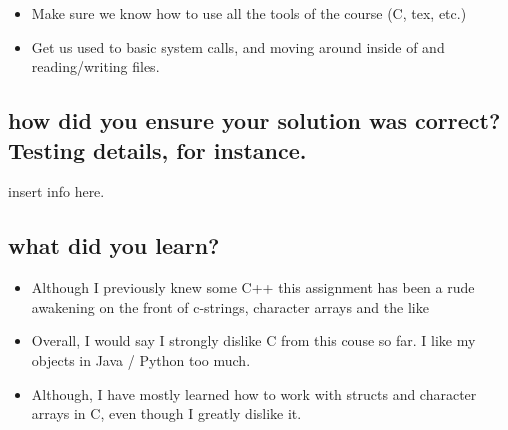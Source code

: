 \documentclass[letterpaper,10pt,titlepage]{article}
\begin{document}
\begin{itemize}
\item Make sure we know how to use all the tools of the course (C, tex, etc.)
\item Get us used to basic system calls, and moving around inside of and reading/writing files.
\end{itemize}

\subsection{how did you ensure your solution was correct? Testing details, for instance.}

insert info here.

\subsection{what did you learn?}

\begin{itemize}
\item Although I previously knew some C++ this assignment has been a rude awakening on the front of c-strings, character arrays and the like
\item Overall, I would say I strongly dislike C from this couse so far.  I like my objects in Java / Python too much.
\item Although, I have mostly learned how to work with structs and character arrays in C, even though I greatly dislike it.
\end{itemize}
\end{document}
